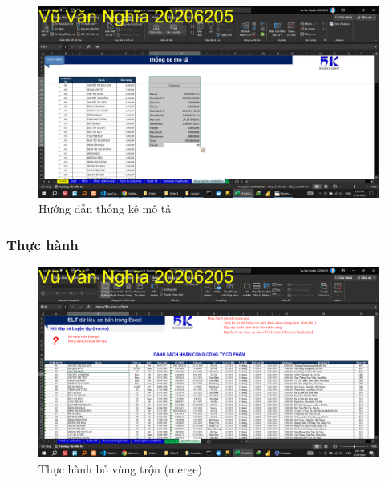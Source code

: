 \documentclass{article}
\begin{document}
\begin{figure}[h]
    \centering
    \includegraphics[scale = 0.15]{Video1/HuongDan/13.png}
    \caption{Hướng dẫn thống kê mô tả}
\end{figure}



\subsubsection{Thực hành}

\begin{figure}[h]
    \centering
    \includegraphics[scale = 0.15]{Video1/ThucHanh/1.png}
    \caption{Thực hành bỏ vùng trộn (merge)}
\end{figure}
\end{document}
